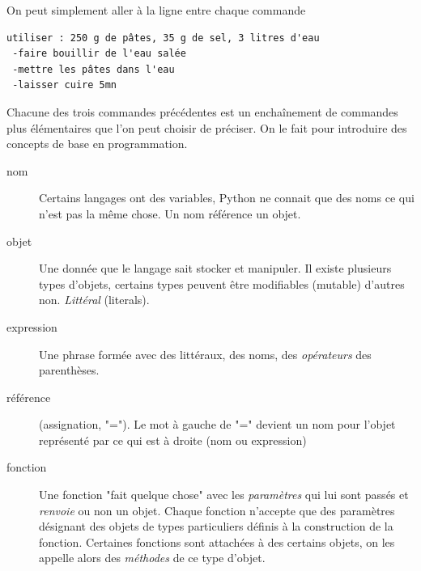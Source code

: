 On peut simplement aller à la ligne entre chaque commande
\begin{verbatim}
utiliser : 250 g de pâtes, 35 g de sel, 3 litres d'eau
 -faire bouillir de l'eau salée
 -mettre les pâtes dans l'eau
 -laisser cuire 5mn
\end{verbatim} 
Chacune des trois commandes précédentes est un enchaînement de commandes plus élémentaires que l'on peut choisir de préciser. On le fait pour introduire des concepts de base en programmation.
\begin{description}
 \item[nom]   Certains langages ont des variables, Python ne connait que des noms ce qui n'est pas la même chose. Un nom référence un objet.
 \item[objet] Une donnée que le langage sait stocker et manipuler. Il existe plusieurs types d'objets, certains types peuvent être modifiables (mutable) d'autres non. \emph{Littéral} (literals).
 \item[expression] Une phrase formée avec des littéraux, des noms, des \emph{opérateurs} des parenthèses.
 \item[référence] (assignation, "="). Le mot à gauche de "=" devient un nom pour l'objet représenté par ce qui est à droite (nom ou expression)
 \item[fonction] Une fonction "fait quelque chose" avec les \emph{paramètres} qui lui sont passés et \emph{renvoie} ou non un objet. Chaque fonction n'accepte que des paramètres désignant des objets de types particuliers définis à la construction de la fonction. Certaines fonctions sont attachées à des certains objets, on les appelle alors des \emph{méthodes}  de ce type d'objet.
\end{description}

